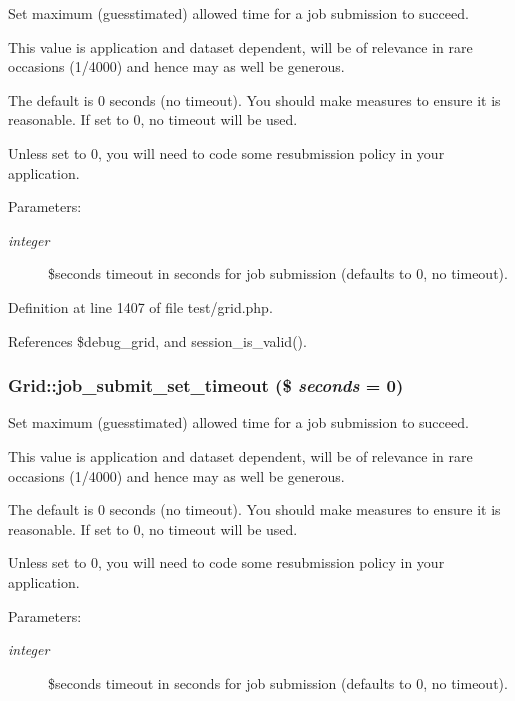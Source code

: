 Set maximum (guesstimated) allowed time for a job submission to succeed. 

This value is application and dataset dependent, will be of relevance in rare occasions (1/4000) and hence may as well be generous.

The default is 0 seconds (no timeout). You should make measures to ensure it is reasonable. If set to 0, no timeout will be used.

Unless set to 0, you will need to code some resubmission policy in your application.

\begin{Desc}
\item[Parameters:]
\begin{description}
\item[{\em integer}]\$seconds timeout in seconds for job submission (defaults to 0, no timeout). \end{description}
\end{Desc}


Definition at line 1407 of file test/grid.php.

References \$debug\_\-grid, and session\_\-is\_\-valid().
\subsubsection{\setlength{\rightskip}{0pt plus 5cm}Grid::job\_\-submit\_\-set\_\-timeout (\$ {\em seconds} = 0)}\label{classGrid_a20}


Set maximum (guesstimated) allowed time for a job submission to succeed. 

This value is application and dataset dependent, will be of relevance in rare occasions (1/4000) and hence may as well be generous.

The default is 0 seconds (no timeout). You should make measures to ensure it is reasonable. If set to 0, no timeout will be used.

Unless set to 0, you will need to code some resubmission policy in your application.

\begin{Desc}
\item[Parameters:]
\begin{description}
\item[{\em integer}]\$seconds timeout in seconds for job submission (defaults to 0, no timeout). \end{description}
\end{Desc}


